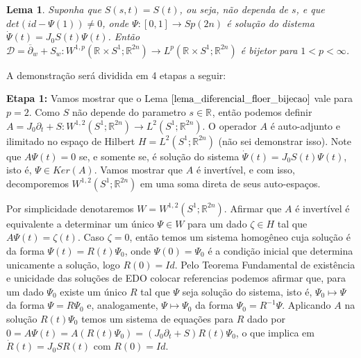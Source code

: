 \documentclass[12pt]{book}
\newtheorem{lema}[teorema]{Lema}
\newcommand{\circulo}{S^{1}}
\newcommand{\diferebcialmapafloerabrev}{\mathcal{D}}
\newcommand{\derivadaparcialabrev}[1]{\partial_{#1}}
\newcommand{\espacoLdois}[1]{L^{2}(#1)}
\newcommand{\espacoLpcontradominio}[2]{L^{p}(#1;#2)}
\newcommand{\espacoLpretacirculo}{\espacoLpcontradominio{\retacartesianocirculo}{\real{2n}}}
\newcommand{\espacosobolevcontradominio}[2]{W^{1,p}(#1;#2)}
\newcommand{\espacosobolevretacirculo}{\espacosobolevcontradominio{\retacartesianocirculo}{\real{2n}}}
\newcommand{\espacosobolevgeral}[2]{W^{1,#1}(#2)}
\newcommand{\estruturacomplexa}{J_{0}}
\newcommand{\gruposimpletico}[1]{Sp(#1)}
\newcommand{\operadorcauchyabrev}[1]{\overline{\partial}_{#1}}
\newcommand{\retacartesianocirculo}{\real{} \times \circulo}
\newcommand{\real}[1]{\mathbb{R}^{#1}}
\newcommand{\vermelho}[1]{{\color{red}#1}}
\begin{document}
	\begin{lema}\label{lema_diferencial_floer_bijecao}
		Suponha que $S(s,t) = S(t)$, ou seja, não dependa de $s$, e que $det(id - \Psi(1)) \neq 0 $, onde $\Psi:[0,1] \to \gruposimpletico{2n}$ é solução do distema $\dot{\Psi}(t)=\estruturacomplexa S(t)\Psi(t)$. Então $\diferebcialmapafloerabrev = \operadorcauchyabrev{w} + S_{w}: \espacosobolevretacirculo \to \espacoLpretacirculo$ é bijetor para $1 < p <\infty$.
	\end{lema}
	
	A demonstração será dividida em 4 etapas a seguir:
	
	\textbf{Etapa 1:} Vamos mostrar que o Lema $\ref{lema_diferencial_floer_bijecao}$ vale para $p=2$. Como $S$ não depende do parametro $s \in \real{}$, então podemos definir $A = \estruturacomplexa \derivadaparcialabrev{t} + S: \espacosobolevgeral{2}{\circulo;\real{2n}} \to \espacoLdois{\circulo;\real{2n}}$. \vermelho{O operador $A$ é auto-adjunto e ilimitado no espaço de Hilbert $H=\espacoLdois{\circulo;\real{2n}}$ (não sei demonstrar isso).} Note que $A\Psi(t) = 0$ se, e somente se, é solução do sistema $\dot{\Psi}(t)=\estruturacomplexa S(t)\Psi(t)$, isto é, $\Psi \in Ker(A)$. Vamos mostrar que $A$ é invertível, e com isso, decomporemos $\espacosobolevgeral{2}{\circulo;\real{2n}} $ em uma soma direta de seus auto-espaços.
	
	Por simplicidade denotaremos $W = \espacosobolevgeral{2}{\circulo;\real{2n}} $. Afirmar que $A$ é invertível é equivalente a determinar um único $\Psi \in W$ para um dado $\zeta \in H$ tal que $A\Psi(t) = \zeta(t)$. Caso $\zeta = 0$, então temos um sistema homogêneo cuja solução é da forma $\Psi(t) = R(t)\Psi_{0}$, onde $\Psi(0)=\Psi_{0}$ é a condição inicial que determina unicamente a solução, logo $R(0) = Id$. Pelo Teorema Fundamental de existência e unicidade das soluções de EDO \vermelho{colocar referencias} podemos afirmar que, para um dado $\Psi_{0}$ existe um único $R$ tal que $\Psi$ seja solução do sistema, isto é, $\Psi_{0} \mapsto \Psi$ da forma $\Psi = R\Psi_{0}$ e, analogamente, $\Psi \mapsto \Psi_{0}$ da forma $\Psi_{0}=R^{-1}\Psi$. Aplicando $A$ na solução $R(t)\Psi_{0}$ temos um sistema de equações para $R$ dado por 
	$0=A\Psi(t) = A(R(t)\Psi_{0}) = (\estruturacomplexa\derivadaparcialabrev{t}+S)R(t)\Psi_{0}$, o que implica em $\dot{R}(t) = \estruturacomplexa SR(t)$ com $R(0) = Id$. 
	
\end{document}
